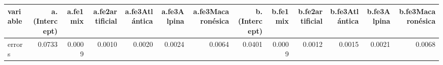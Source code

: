 \begin{table}[ht]
\centering
\begin{tabular}{lrrrrrrrrrrrr}
  \hline
variable & a.(Intercept) & a.fe1mix & a.fe2artificial & a.fe3Atlántica & a.fe3Alpina & a.fe3Macaronésica & b.(Intercept) & b.fe1mix & b.fe2artificial & b.fe3Atlántica & b.fe3Alpina & b.fe3Macaronésica \\ 
  \hline
errors & 0.0733 & 0.0009 & 0.0010 & 0.0020 & 0.0024 & 0.0064 & 0.0401 & 0.0009 & 0.0012 & 0.0015 & 0.0021 & 0.0068 \\ 
   \hline
\end{tabular}
\end{table}
